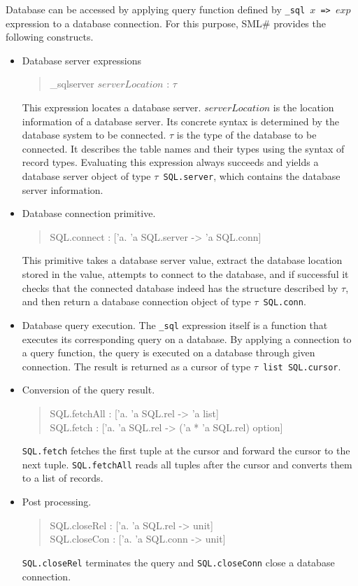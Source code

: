 \documentclass{jbook}
\newcommand{\smlsharp}{SML\#}
\newenvironment{program}{\begin{quote}\begin{tt}}%
                        {\end{tt}\end{quote}}
\begin{document}
\else%
	Database can be accessed by applying query function defined by
{\tt \_sql $x$ => $exp$} expression to a database connection.
	For this purpose, \smlsharp{} provides the following constructs.
\begin{itemize}
\item Database server expressions
\begin{program}
\_sqlserver $serverLocation$ : $\tau$
\end{program}
	This expression locates a database server.
	$serverLocation$ is the location information of a database
server.
	Its concrete syntax is determined by the database system to be
connected.
	$\tau$ is the type of the database to be connected.
	It describes the table names and their types using the syntax
of record types.
	Evaluating this expression always succeeds and  yields a
database server object of type {\tt $\tau$ SQL.server}, which contains
the database server information.
\item Database connection primitive.
\begin{program}
SQL.connect : ['a. 'a SQL.server -> 'a SQL.conn]
\end{program}
	This primitive takes a database server value, extract the
database location stored in the value, attempts to connect to the
database, and if successful it checks that the connected database
indeed has the structure described by $\tau$, and then return 
a database connection object of type {\tt $\tau$ SQL.conn}.
	
\item Database query execution.
	The {\tt \_sql} expression itself is a function that executes
its corresponding query on a database.
	By applying a connection to a query function,
the query is executed on a database through given connection.
	The result is returned as a cursor of type
{\tt $\tau$ list SQL.cursor}.

\item Conversion of the query result.
\begin{program}
SQL.fetchAll : ['a. 'a SQL.rel -> 'a list]\\
SQL.fetch : ['a. 'a SQL.rel -> ('a * 'a SQL.rel) option]
\end{program}
	{\tt SQL.fetch} fetches the first tuple at the cursor and
forward the cursor to the next tuple.
	{\tt SQL.fetchAll} reads all tuples after the cursor and
converts them to a list of records.

\item Post processing.
\begin{program}
SQL.closeRel : ['a. 'a SQL.rel -> unit]\\
SQL.closeCon : ['a. 'a SQL.conn -> unit]
\end{program}
	{\tt SQL.closeRel} terminates the query and {\tt SQL.closeConn}
close a database connection.
\end{itemize}
\fi%
		
\end{document}

